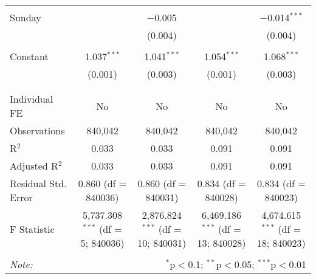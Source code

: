 \documentclass[
]{article}
\begin{document}
\begin{table}[!htbp]
{\begin{tabular}{@{\extracolsep{5pt}}lcccc}
  & & & & \\ 
 Sunday &  & $-$0.005 &  & $-$0.014$^{***}$ \\ 
  &  & (0.004) &  & (0.004) \\ 
  & & & & \\ 
 Constant & 1.037$^{***}$ & 1.041$^{***}$ & 1.054$^{***}$ & 1.068$^{***}$ \\ 
  & (0.001) & (0.003) & (0.001) & (0.003) \\ 
  & & & & \\ 
\hline \\[-1.8ex] 
Individual FE & No & No & No & No \\ 
Observations & 840,042 & 840,042 & 840,042 & 840,042 \\ 
R$^{2}$ & 0.033 & 0.033 & 0.091 & 0.091 \\ 
Adjusted R$^{2}$ & 0.033 & 0.033 & 0.091 & 0.091 \\ 
Residual Std. Error & 0.860 (df = 840036) & 0.860 (df = 840031) & 0.834 (df = 840028) & 0.834 (df = 840023) \\ 
F Statistic & 5,737.308$^{***}$ (df = 5; 840036) & 2,876.824$^{***}$ (df = 10; 840031) & 6,469.186$^{***}$ (df = 13; 840028) & 4,674.615$^{***}$ (df = 18; 840023) \\ 
\hline 
\hline \\[-1.8ex] 
\textit{Note:}  & \multicolumn{4}{r}{$^{*}$p$<$0.1; $^{**}$p$<$0.05; $^{***}$p$<$0.01} \\ 
\end{tabular}
} 
\end{table} 
\newpage
\end{document}
